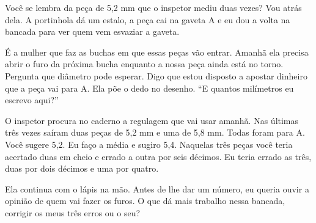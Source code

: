 Você se lembra da peça de 5,2 mm que o inspetor mediu duas vezes? Vou atrás dela. A portinhola dá um estalo, a peça cai na gaveta A e eu dou a volta na bancada para ver quem vem esvaziar a gaveta.

É a mulher que faz as buchas em que essas peças vão entrar. Amanhã ela precisa abrir o furo da próxima bucha enquanto a nossa peça ainda está no torno. Pergunta que diâmetro pode esperar. Digo que estou disposto a apostar dinheiro que a peça vai para A. Ela põe o dedo no desenho. “E quantos milímetros eu escrevo aqui?”

O inspetor procura no caderno a regulagem que vai usar amanhã. Nas últimas três vezes saíram duas peças de 5,2 mm e uma de 5,8 mm. Todas foram para A. Você sugere 5,2. Eu faço a média e sugiro 5,4. Naquelas três peças você teria acertado duas em cheio e errado a outra por seis décimos. Eu teria errado as três, duas por dois décimos e uma por quatro.

Ela continua com o lápis na mão. Antes de lhe dar um número, eu queria ouvir a opinião de quem vai fazer os furos. O que dá mais trabalho nessa bancada, corrigir os meus três erros ou o seu?

